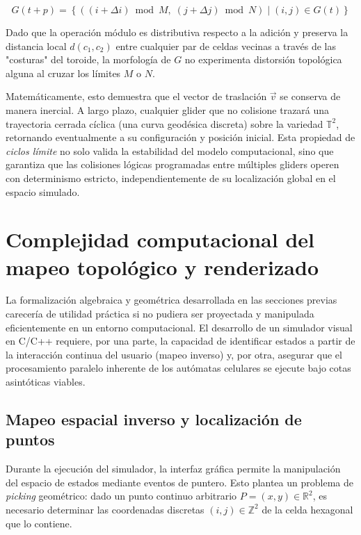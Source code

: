 \begin{equation}
    G(t+p) = \left\{ \left( (i + \Delta i) \bmod M, \; (j + \Delta j) \bmod N \right) \mid (i, j) \in G(t) \right\}
\end{equation}

Dado que la operación módulo es distributiva respecto a la adición y preserva la distancia local $d(c_1, c_2)$ entre cualquier par de celdas vecinas a través de las "costuras" del toroide, la morfología de $G$ no experimenta distorsión topológica alguna al cruzar los límites $M$ o $N$. 

Matemáticamente, esto demuestra que el vector de traslación $\vec{v}$ se conserva de manera inercial. A largo plazo, cualquier glider que no colisione trazará una trayectoria cerrada cíclica (una curva geodésica discreta) sobre la variedad $\mathbb{T}^2$, retornando eventualmente a su configuración y posición inicial. Esta propiedad de \textit{ciclos límite} no solo valida la estabilidad del modelo computacional, sino que garantiza que las colisiones lógicas programadas entre múltiples gliders operen con determinismo estricto, independientemente de su localización global en el espacio simulado.



\section{Complejidad computacional del mapeo topológico y renderizado}
\label{sec:complejidad_renderizado}

La formalización algebraica y geométrica desarrollada en las secciones previas carecería de utilidad práctica si no pudiera ser proyectada y manipulada eficientemente en un entorno computacional. El desarrollo de un simulador visual en C/C++ requiere, por una parte, la capacidad de identificar estados a partir de la interacción continua del usuario (mapeo inverso) y, por otra, asegurar que el procesamiento paralelo inherente de los autómatas celulares se ejecute bajo cotas asintóticas viables. 

\subsection{Mapeo espacial inverso y localización de puntos}

Durante la ejecución del simulador, la interfaz gráfica permite la manipulación del espacio de estados mediante eventos de puntero. Esto plantea un problema de \textit{picking} geométrico: dado un punto continuo arbitrario $P = (x,y) \in \mathbb{R}^2$, es necesario determinar las coordenadas discretas $(i,j) \in \mathbb{Z}^2$ de la celda hexagonal que lo contiene. 

